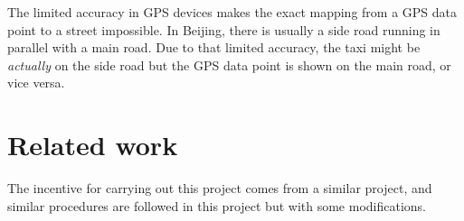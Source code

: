 The limited accuracy in GPS devices makes the exact mapping from a GPS data point to a street impossible. In Beijing, there is usually a side road running in parallel with a main road. Due to that limited accuracy, the taxi might be \emph{actually} on the side road but the GPS data point is shown on the main road, or vice versa. 
%
\section{Related work}
The incentive for carrying out this project comes from a similar project\cite{TDR10}, and similar procedures are followed in this project but with some modifications. 


